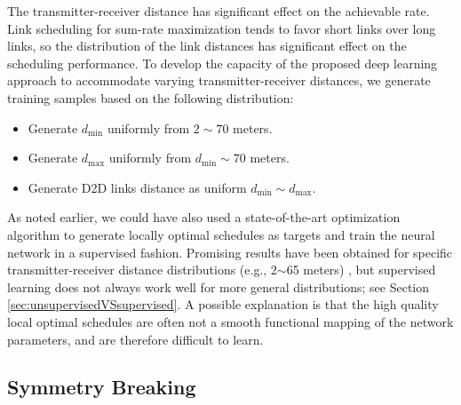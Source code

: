 \documentclass[journal,12pt,onecolumn,draftclsnofoot,]{IEEEtran}
\begin{document}
The transmitter-receiver distance has significant effect on the achievable
rate. Link scheduling for sum-rate maximization tends to favor short links over
long links, %
so the distribution of the link distances has significant effect on the
scheduling performance.
To develop the capacity of the proposed deep learning approach to accommodate 
varying transmitter-receiver distances, we
generate training samples based on the following distribution: 
\begin{itemize}
\item Generate $d_{\min}$ uniformly from $2\sim70$ meters.
\item Generate $d_{\max}$ uniformly from $d_{\min}\sim70$ meters.
\item Generate D2D links distance as uniform $d_{\min}\sim d_{\max}$.
\end{itemize}

As noted earlier, we could have also used a state-of-the-art optimization
algorithm to generate locally optimal schedules as targets and train the neural
network in a supervised fashion. 
Promising results have been obtained for specific transmitter-receiver distance
distributions (e.g., 2$\sim$65 meters) \cite{Cui_GC}, but supervised learning 
does not always work well for more general distributions; see Section \ref{sec:unsupervisedVSsupervised}.
A possible explanation is that the high quality local optimal schedules are
often not a smooth functional mapping of the network parameters, and are
therefore difficult to learn. 

\subsection{Symmetry Breaking}
\end{document}
